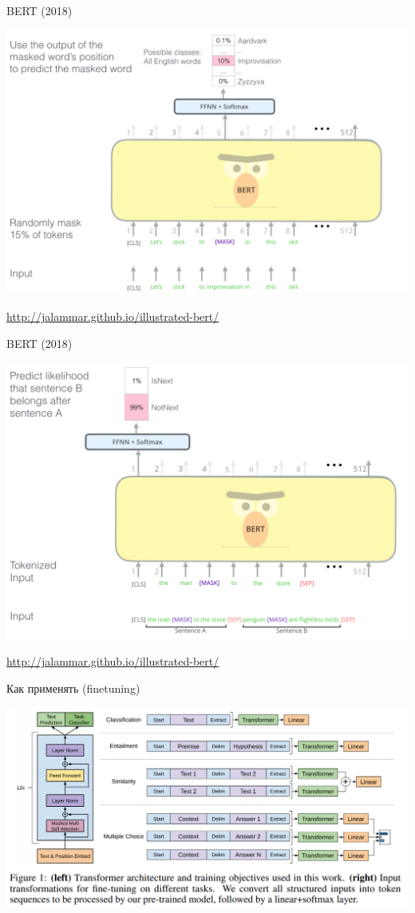 \documentclass[notes,12pt, aspectratio=169]{beamer}
\begin{document}
\begin{frame}{BERT (2018)}
		\begin{center}
			\includegraphics[width=0.7\linewidth]{pre_train_bert}
		\end{center}
		\vfill
		\footnotesize
		{\color{blue} \url{http://jalammar.github.io/illustrated-bert/}}
\end{frame}


\begin{frame}{BERT (2018)}
		\begin{center}
			\includegraphics[width=0.65\linewidth]{bert_sent}
		\end{center}
		\vfill
		\footnotesize
		{\color{blue} \url{http://jalammar.github.io/illustrated-bert/}}
\end{frame}



\begin{frame}{Как применять (finetuning)}
	\begin{center}
		\includegraphics[width=0.9\linewidth]{images/use_models}
	\end{center}
\end{frame}
\end{document}
